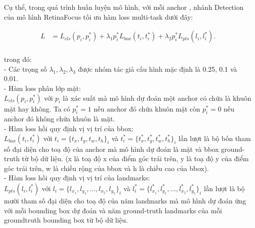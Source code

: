 {    Cụ thể, trong quá trình huấn luyện mô hình, với mỗi anchor , nhánh Detection  của mô hình RetinaFocus tối ưu hàm loss multi-task dưới đây:

    \begin{equation}
        \begin{split}
        L  & =  L_{cls}(p_i, p^{*}_i) + \lambda_1 p^{*}_i L_{box}(t_i, t^{*}_i) + \lambda_2 p^{*}_i L_{pts} (l_i, l^{*}_i).\\
        \end{split}
        \label{eq:retinaface_loss}
    \end{equation}

    \noindent
    trong đó: \\
    - Các trọng số $\lambda_1, \lambda_2, \lambda_3$ được nhóm tác giả cấu hình mặc định là 0.25, 0.1 và 0.01. \\
    - Hàm loss phân lớp mặt: \\
    $L_{cls}(p_i, p^{*}_i)$ với $p_i$ là xác suất mà mô hình dự đoán một anchor  có chứa là khuôn mặt hay không.
    Ta có $p^{*}_i = 1$ nếu anchor  đó chứa khuôn mặt còn $p^{*}_i = 0$ nếu anchor  đó không chứa khuôn là mặt. \\
    - Hàm loss hồi quy định vị vị trí của bbox: \\
    $L_{box}(t_i, t^{*}_i)$ với $t_i=\{t_x, t_y, t_w, t_h\}_i$ và $t^{*}_i=\{t^{*}_x, t^{*}_y, t^{*}_w, t^{*}_h\}_i$ lần lượt là bộ bốn tham số đại diện cho toạ độ của anchor  mà mô hình dự đoán là mặt và bbox ground-truth từ bộ dữ liệu.
    (x là toạ độ x của điểm góc trái trên, y là toạ độ y của điểm góc trái trên, w là chiều rộng của bbox và h là chiều cao của bbox). \\
    - Hàm loss hồi quy định vị vị trí của landmarks: \\
    $L_{pts} (l_i, l^{*}_i)$ với $l_i=\{l_{x_1}, l_{y_1}, \dots , l_{x_5}, l_{y_5}\}_i$ và $l^{*}_i=\{l^{*}_{x_1}, l^{*}_{y_1}, \dots , l^{*}_{x_5}, l^{*}_{y_5}\}_i$ lần lượt là bộ mười tham số đại diện cho toạ độ của năm landmarks mà mô hình dự đoán ứng với mỗi bounding box  dự đoán và năm ground-truth landmarks của mỗi groundtruth  bounding box  từ bộ dữ liệu.
    
}